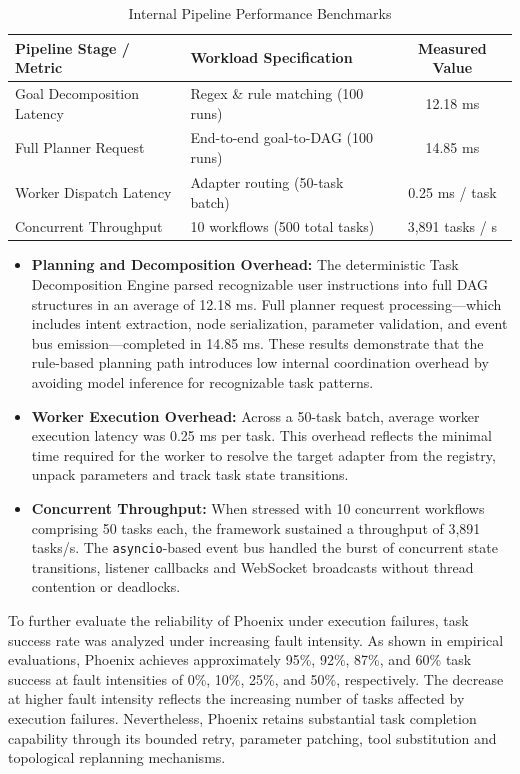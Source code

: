\documentclass[conference]{IEEEtran}
\begin{document}
\begin{table}[htbp]
\caption{Internal Pipeline Performance Benchmarks}
\label{tab:framework_benchmarks}
\centering
\begin{tabular}{p{2.6cm} p{3.4cm} c}
\toprule
\textbf{Pipeline Stage / Metric} & \textbf{Workload Specification} & \textbf{Measured Value} \\
\midrule
Goal Decomposition Latency & Regex \& rule matching (100 runs) & 12.18 ms \\
Full Planner Request & End-to-end goal-to-DAG (100 runs) & 14.85 ms \\
Worker Dispatch Latency & Adapter routing (50-task batch) & 0.25 ms / task \\
Concurrent Throughput & 10 workflows (500 total tasks) & 3,891 tasks / s \\
\bottomrule
\end{tabular}
\end{table}

\begin{itemize}
    \item \textbf{Planning and Decomposition Overhead:} The deterministic Task Decomposition Engine parsed recognizable user instructions into full DAG structures in an average of 12.18 ms. Full planner request processing—which includes intent extraction, node serialization, parameter validation, and event bus emission—completed in 14.85 ms. These results demonstrate that the rule-based planning path introduces low internal coordination overhead by avoiding model inference for recognizable task patterns.
    \item \textbf{Worker Execution Overhead:} Across a 50-task batch, average worker execution latency was 0.25 ms per task. This overhead reflects the minimal time required for the worker to resolve the target adapter from the registry, unpack parameters and track task state transitions.
    \item \textbf{Concurrent Throughput:} When stressed with 10 concurrent workflows comprising 50 tasks each, the framework sustained a throughput of 3,891 tasks/s. The \texttt{asyncio}-based event bus handled the burst of concurrent state transitions, listener callbacks and WebSocket broadcasts without thread contention or deadlocks.
\end{itemize}

To further evaluate the reliability of Phoenix under execution failures, task success rate was analyzed under increasing fault intensity. As shown in empirical evaluations, Phoenix achieves approximately 95\%, 92\%, 87\%, and 60\% task success at fault intensities of 0\%, 10\%, 25\%, and 50\%, respectively. The decrease at higher fault intensity reflects the increasing number of tasks affected by execution failures. Nevertheless, Phoenix retains substantial task completion capability through its bounded retry, parameter patching, tool substitution and topological replanning mechanisms.
\end{document}
